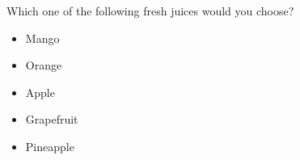 
\begin{tcolorbox}
Which one of the following fresh juices would you choose?

\begin{itemize}
	\setlength\itemsep{-5pt}
	\item Mango
	\item Orange
	\item Apple
	\item Grapefruit
	\item Pineapple
\end{itemize}
\end{tcolorbox}
